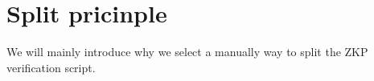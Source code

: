 \section{Split pricinple} \label{sec:split-pricinple}

We will mainly introduce why we select a manually way to split the ZKP verification script.




